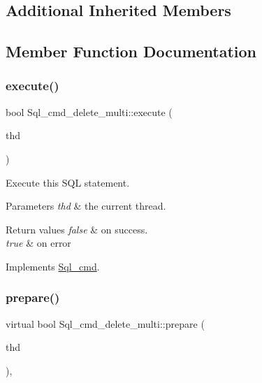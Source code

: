 \subsection*{Additional Inherited Members}


\subsection{Member Function Documentation}
\mbox{\label{classSql__cmd__delete__multi_ac23aab4d1bf9cd9d5c799d2843558810}} 
\subsubsection{\texorpdfstring{execute()}{execute()}}
{\footnotesize\ttfamily bool Sql\+\_\+cmd\+\_\+delete\+\_\+multi\+::execute (\begin{DoxyParamCaption}\item[{T\+HD $\ast$}]{thd }\end{DoxyParamCaption})\hspace{0.3cm}{\ttfamily [virtual]}}

Execute this S\+QL statement. 
\begin{DoxyParams}{Parameters}
{\em thd} & the current thread. \\
\hline
\end{DoxyParams}

\begin{DoxyRetVals}{Return values}
{\em false} & on success. \\
\hline
{\em true} & on error \\
\hline
\end{DoxyRetVals}


Implements \mbox{\hyperlink{classSql__cmd_a213367b79b551296fbb7790f2a3732fb}{Sql\+\_\+cmd}}.

\mbox{\label{classSql__cmd__delete__multi_af069c73c8b62527f3bf8de0b9ce45297}} 
\subsubsection{\texorpdfstring{prepare()}{prepare()}}
{\footnotesize\ttfamily virtual bool Sql\+\_\+cmd\+\_\+delete\+\_\+multi\+::prepare (\begin{DoxyParamCaption}\item[{T\+HD $\ast$}]{thd }\end{DoxyParamCaption})\hspace{0.3cm}{\ttfamily [inline]}, {\ttfamily [virtual]}}

